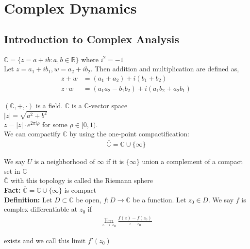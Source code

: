 \documentclass[12pt]{article}
\begin{document}
\newpage
\section{Complex Dynamics}

\subsection{Introduction to Complex Analysis}

$\mathbb{C} = \{z = a + ib : a,b \in \mathbb{R}\}$ where $i^2 = -1$\\

Let $z = a_1 + ib_1, w = a_2 + ib_2$. Then addition and multiplication are defined as,
\begin{align*}
z + w &= (a_1 + a_2) + i(b_1 + b_2)\\
z \cdot w &= (a_1a_2 - b_1b_2) + i(a_1b_2 + a_2b_1)
\end{align*}

$(\mathbb{C}, +, \cdot)$ is a field. $\mathbb{C}$ is a $\mathbb{C}$-vector space\\

$|z| = \sqrt{a^2 + b^2}$\\

$z = |z| \cdot e^{2 \pi i \rho}$ for some $\rho \in [0, 1)$.\\

We can compactify $\mathbb{C}$ by using the one-point compactification:
\begin{align*}
\overline{\mathbb{C}} = \mathbb{C} \cup \{\infty\}
\end{align*}

We say $U$ is a neighborhood of $\infty$ if it is $\{\infty\}$ union a complement of a compact set in $\mathbb{C}$\\

$\overline{\mathbb{C}}$ with this topology is called the Riemann sphere\\

\textbf{Fact:} $\overline{\mathbb{C}} = \mathbb{C} \cup \{\infty\}$ is compact\\

\textbf{Definition:} Let $D \subset \mathbb{C}$ be open, $f: D \to \mathbb{C}$ be a function. Let $z_0 \in D$. We say $f$ is complex differentiable at $z_0$ if 
\begin{align*}
\lim_{z \to z_0} \frac{f(z) - f(z_0)}{z - z_0}
\end{align*}

exists and we call this limit $f'(z_0)$\\
\end{document}
